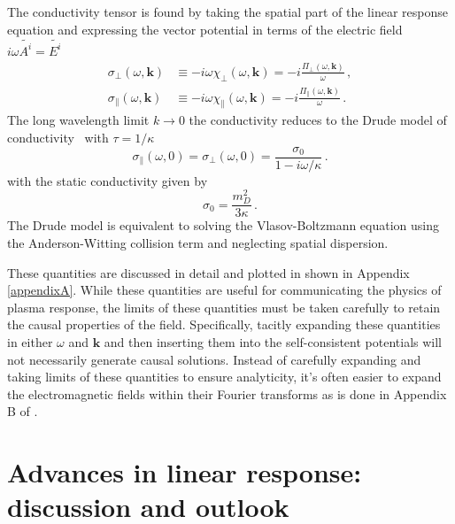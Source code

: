 The conductivity tensor is found by taking the spatial part of the linear response equation  and expressing the vector potential in terms of the electric field $i \omega \widetilde{A^i} = \widetilde{E^i}$~\cite{Starke:2014tfa,melrose2008quantum}
\begin{align}\label{eq:sigmaperp}
    \sigma_\perp(\omega,\boldsymbol{k}) &\equiv - i \omega \chi_\perp(\omega,\boldsymbol{k}) =- i \frac{\Pi_\perp(\omega,\boldsymbol{k})}{\omega} \,,\\
    \sigma_\parallel(\omega,\boldsymbol{k}) &\equiv - i \omega \chi_\parallel(\omega,\boldsymbol{k}) =- i \frac{\Pi_\parallel(\omega,\boldsymbol{k})}{\omega} \,.
\end{align} 
The long wavelength limit $k \to 0$ the conductivity reduces to the Drude model of conductivity~\cite{Drude:1900} with $\tau = 1/\kappa$
\begin{equation}\label{eq:drude}
    \sigma_\parallel(\omega,0) = \sigma_\perp(\omega,0) = \frac{\sigma_0}{1-i \omega/\kappa} \,.
\end{equation}
with the static conductivity given by
\begin{equation}\label{eq:condstat}
   \sigma_0 = \frac{m_D^2}{3\kappa}\,.
\end{equation} 
The Drude model is equivalent to solving the Vlasov-Boltzmann equation using the Anderson-Witting collision term  and neglecting spatial dispersion.

These quantities are discussed in detail and plotted in \cite{Formanek:2021blc} shown in Appendix \ref{appendixA}. While these quantities are useful for communicating the physics of plasma response, the limits of these quantities must be taken carefully to retain the causal properties of the field. Specifically, tacitly expanding these quantities in either $\omega$ and $\mathbf{k}$ and then inserting them into the self-consistent potentials  will not necessarily generate causal solutions. Instead of carefully expanding and taking limits of these quantities to ensure analyticity, it's often easier to expand the electromagnetic fields within their Fourier transforms as is done in Appendix B of \cite{Grayson:2022asf}.

\section{Advances in linear response: discussion and outlook}

